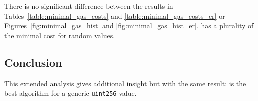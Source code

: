 There is no significant difference between the results in 
Tables~\ref{table:minimal_gas_costs} and \ref{table:minimal_gas_costs_er}
or Figures~\ref{fig:minimal_gas_hist} and \ref{fig:minimal_gas_hist_er}.
\UnrolledThree{} has a plurality of the minimal cost for random values.




\subsection{Conclusion}

This extended analysis gives additional insight but with the same result:
\UnrolledThree{} is the best algorithm
for a generic \texttt{uint256} value.
